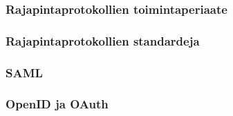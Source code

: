 
\subsubsection{Rajapintaprotokollien toimintaperiaate}

\subsubsection{Rajapintaprotokollien standardeja}

\subsubsection{SAML}

\subsubsection{OpenID ja OAuth}
